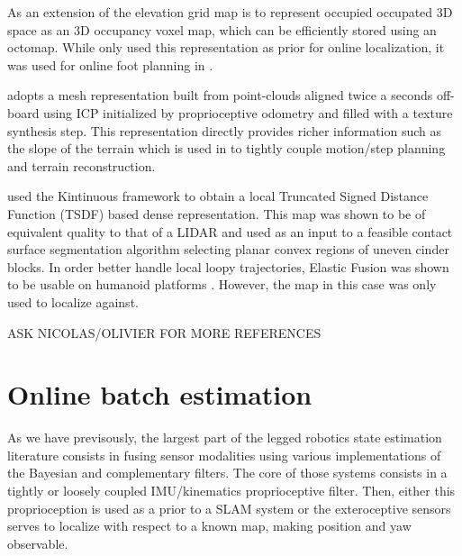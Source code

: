 As an extension of the elevation grid map is to represent occupied occupated 3D space as an 3D occupancy voxel map, which can be efficiently stored using an octomap.
While \cite{fallon2014drift} only used this representation as prior for online localization, it was used for online foot planning in \cite{winkler2015planning, mastalli2015line}. 

\cite{kolter2009stereo} adopts a mesh representation built from point-clouds aligned twice a seconds off-board using ICP initialized by proprioceptive odometry and filled with
a texture synthesis step. This representation directly provides richer information such as the slope of the terrain which is used in \cite{mastalli2020motion} to 
tightly couple motion/step planning and terrain reconstruction. 


\cite{fallon2015continuous} used the Kintinuous framework to obtain a local Truncated Signed Distance Function (TSDF) based dense representation. This map was
shown to be of equivalent quality to that of a LIDAR and used as an input to a feasible contact surface segmentation algorithm selecting planar convex regions of uneven cinder blocks. 
In order better handle local loopy trajectories, Elastic Fusion was shown to be usable on humanoid platforms \cite{scona2017direct}. However, the map in this case was only used to localize against.



ASK NICOLAS/OLIVIER FOR MORE REFERENCES






\section{Online batch estimation}
As we have previsously, the largest part of the legged robotics state estimation literature consists in fusing sensor modalities using various 
implementations of the Bayesian and complementary filters. The core of those systems consists in a tightly or loosely coupled IMU/kinematics proprioceptive
filter. Then, either this proprioception is used as a prior to a SLAM system or the exteroceptive sensors serves to localize with respect to a known map,
making position and yaw observable.

